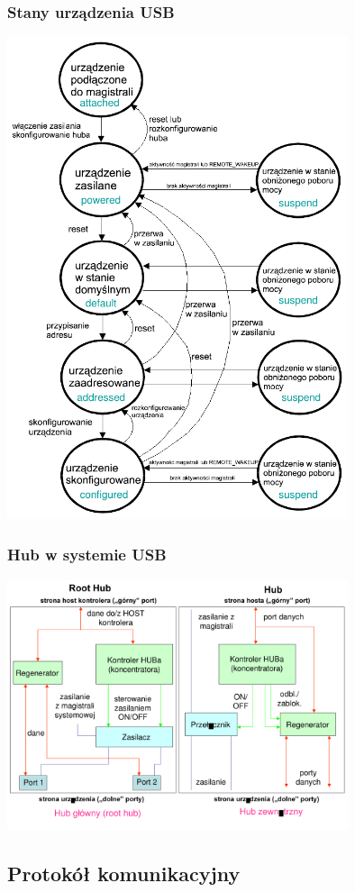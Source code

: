 \documentclass[a4paper,twoside]{article}
\begin{document}
		\subsubsection{Stany urządzenia USB}
		\includegraphics[width=10cm]{./wyklady/USB_16_1.pdf}
		\subsubsection{Hub w systemie USB}
		\includegraphics[width=10cm]{./wyklady/USB_17_1.pdf}
	
\subsection{Protokół komunikacyjny}
\end{document}
